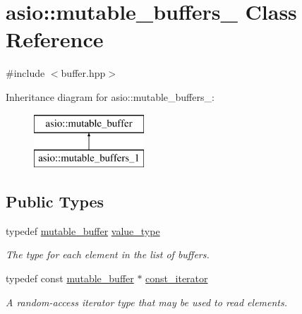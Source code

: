 \hypertarget{classasio_1_1mutable__buffers__1}{}\section{asio\+:\+:mutable\+\_\+buffers\+\_ Class Reference}
\label{classasio_1_1mutable__buffers__1}


{\ttfamily \#include $<$buffer.\+hpp$>$}

Inheritance diagram for asio\+:\+:mutable\+\_\+buffers\+\_\+:\begin{figure}[H]
\begin{center}
\leavevmode
\includegraphics[height=2.000000cm]{classasio_1_1mutable__buffers__1}
\end{center}
\end{figure}
\subsection*{Public Types}
\begin{DoxyCompactItemize}
\item 
typedef \hyperlink{classasio_1_1mutable__buffer}{mutable\+\_\+buffer} \hyperlink{classasio_1_1mutable__buffers__1_ad0f0d91dda82c809af784aaedafc4890}{value\+\_\+type}
\begin{DoxyCompactList}\small\item\em The type for each element in the list of buffers. \end{DoxyCompactList}\item 
typedef const \hyperlink{classasio_1_1mutable__buffer}{mutable\+\_\+buffer} $\ast$ \hyperlink{classasio_1_1mutable__buffers__1_a50acb7cfb33b2e076062b79930452b51}{const\+\_\+iterator}
\begin{DoxyCompactList}\small\item\em A random-\/access iterator type that may be used to read elements. \end{DoxyCompactList}\end{DoxyCompactItemize}
